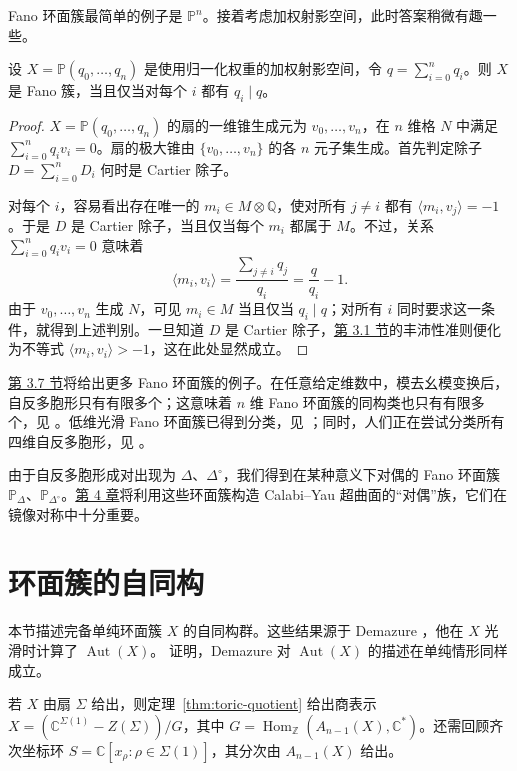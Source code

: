 Fano 环面簇最简单的例子是 $\mathbb P^n$。接着考虑加权射影空间，此时答案稍微有趣一些。
\begin{lemma}\label{lem:weighted-projective-fano}
设 $X=\mathbb P(q_0,\ldots,q_n)$ 是使用归一化权重的加权射影空间，令 $q=\sum_{i=0}^n q_i$。则 $X$ 是 Fano 簇，当且仅当对每个 $i$ 都有 $q_i\mid q$。
\end{lemma}
\begin{proof}
$X=\mathbb P(q_0,\ldots,q_n)$ 的扇的一维锥生成元为 $v_0,\ldots,v_n$，在 $n$ 维格 $N$ 中满足 $\sum_{i=0}^n q_iv_i=0$。扇的极大锥由 $\{v_0,\ldots,v_n\}$ 的各 $n$ 元子集生成。首先判定除子 $D=\sum_{i=0}^n D_i$ 何时是 Cartier 除子。

对每个 $i$，容易看出存在唯一的 $m_i\in M\otimes\mathbb Q$，使对所有 $j\ne i$ 都有 $\langle m_i,v_j\rangle=-1$。于是 $D$ 是 Cartier 除子，当且仅当每个 $m_i$ 都属于 $M$。不过，关系 $\sum_{i=0}^n q_iv_i=0$ 意味着
\[
\langle m_i,v_i\rangle=\frac{\sum_{j\ne i}q_j}{q_i}
=\frac q{q_i}-1.
\]
由于 $v_0,\ldots,v_n$ 生成 $N$，可见 $m_i\in M$ 当且仅当 $q_i\mid q$；对所有 $i$ 同时要求这一条件，就得到上述判别。一旦知道 $D$ 是 Cartier 除子，\hyperref[sec:cones-fans]{第 3.1 节}的丰沛性准则便化为不等式 $\langle m_i,v_i\rangle>-1$，这在此处显然成立。
\end{proof}

\hyperref[sec:toric-examples]{第 3.7 节}将给出更多 Fano 环面簇的例子。在任意给定维数中，模去幺模变换后，自反多胞形只有有限多个；这意味着 $n$ 维 Fano 环面簇的同构类也只有有限多个，见 。低维光滑 Fano 环面簇已得到分类，见 ；同时，人们正在尝试分类所有四维自反多胞形，见 。

由于自反多胞形成对出现为 $\Delta$、$\Delta^\circ$，我们得到在某种意义下对偶的 Fano 环面簇 $\mathbb P_\Delta$、$\mathbb P_{\Delta^\circ}$。\hyperref[chap:mirror-constructions]{第 4 章}将利用这些环面簇构造 Calabi--Yau 超曲面的“对偶”族，它们在镜像对称中十分重要。

\section{环面簇的自同构}\label{sec:toric-automorphisms}

本节描述完备单纯环面簇 $X$ 的自同构群。这些结果源于 Demazure ，他在 $X$ 光滑时计算了 $\operatorname{Aut}(X)$。 证明，Demazure 对 $\operatorname{Aut}(X)$ 的描述在单纯情形同样成立。

若 $X$ 由扇 $\Sigma$ 给出，则定理~\ref{thm:toric-quotient} 给出商表示 $X=(\mathbb C^{\Sigma(1)}-Z(\Sigma))/G$，其中 $G=\operatorname{Hom}_{\mathbb Z}(A_{n-1}(X),\mathbb C^*)$。还需回顾齐次坐标环 $S=\mathbb C[x_\rho:\rho\in\Sigma(1)]$，其分次由 $A_{n-1}(X)$ 给出。

